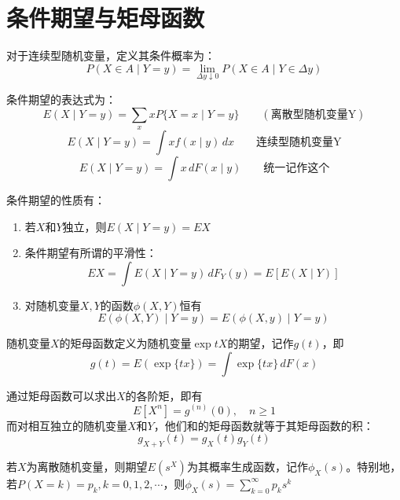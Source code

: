 \documentclass[]{report}
\begin{document}
	\section{条件期望与矩母函数}
		对于连续型随机变量，定义其条件概率为：
		\[P(X\in A\mid Y=y)=\lim_{\Delta y\downarrow0}P(X\in A\mid Y\in\Delta y)\]\par
		条件期望的表达式为：
		\[E(X\mid Y=y)=\sum_xxP\{X=x\mid Y=y\}\qquad(\mbox{离散型随机变量Y})\]
		\[E(X\mid Y=y)=\int xf(x\mid y)\,dx\qquad\mbox{连续型随机变量Y}\]
		\[E(X\mid Y=y)=\int x\,dF(x\mid y)\qquad\mbox{统一记作这个}\]\par
		条件期望的性质有：
		\begin{enumerate}
			\item 若$X$和$Y$独立，则$E(X\mid Y=y)=EX$
			\item 条件期望有所谓的平滑性：\[EX=\int E(X\mid Y=y)\,dF_Y(y)=E[E(X\mid Y)]\]
			\item 对随机变量$X,Y$的函数$\phi(X,Y)$恒有\[E(\phi(X,Y)\mid Y=y)=E(\phi(X,y)\mid Y=y)\]
		\end{enumerate}\par
		\begin{definition}[矩母函数]
			随机变量$X$的矩母函数定义为随机变量$\exp{tX}$的期望，记作$g(t)$，即
			\[g(t)=E(\exp\{tx\})=\int\exp\{tx\}\,dF(x)\]
		\end{definition}
		通过矩母函数可以求出$X$的各阶矩，即有
		\[E[X^n]=g^{(n)}(0),\quad n\ge1\]
		而对相互独立的随机变量$X$和$Y$，他们和的矩母函数就等于其矩母函数的积：
		\[g_{X+Y}(t)=g_{X}(t)g_{Y}(t)\]
		\begin{definition}[生成函数]
			若$X$为离散随机变量，则期望$E(s^X)$为其概率生成函数，记作$\phi_X(s)$。特别地，若$P(X=k)=p_k,k=0,1,2,\cdots$，则$\displaystyle\phi_X(s)=\sum_{k=0}^{\infty}p_ks^k$
		\end{definition}
\end{document}
